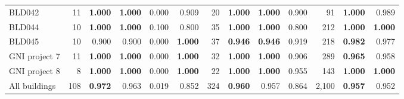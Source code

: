 \begin{table}[htbp]
\begin{tabular}{@{}lrrrrrrrrrrrr@{}}
BLD042 & 11 & \textbf{1.000} & \textbf{1.000} & 0.000 & 0.909 & 20 & \textbf{1.000} & \textbf{1.000} & 0.900 & 91 & \textbf{1.000} & 0.989 \\
BLD044 & 10 & \textbf{1.000} & \textbf{1.000} & 0.100 & 0.800 & 35 & \textbf{1.000} & \textbf{1.000} & 0.800 & 212 & \textbf{1.000} & \textbf{1.000} \\
BLD045 & 10 & 0.900 & 0.900 & 0.000 & \textbf{1.000} & 37 & \textbf{0.946} & \textbf{0.946} & 0.919 & 218 & \textbf{0.982} & 0.977 \\
GNI project 7 & 11 & \textbf{1.000} & \textbf{1.000} & 0.000 & \textbf{1.000} & 32 & \textbf{1.000} & \textbf{1.000} & 0.906 & 289 & \textbf{0.965} & 0.958 \\
GNI project 8 & 8 & \textbf{1.000} & \textbf{1.000} & 0.000 & \textbf{1.000} & 22 & \textbf{1.000} & \textbf{1.000} & 0.955 & 143 & \textbf{1.000} & \textbf{1.000} \\
\midrule
All buildings & 108 & \textbf{0.972} & 0.963 & 0.019 & 0.852 & 324 & \textbf{0.960} & 0.957 & 0.864 & 2,100 & \textbf{0.957} & 0.952 \\
\bottomrule
\end{tabular}
\end{table}
